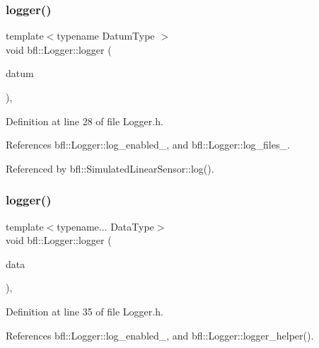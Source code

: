 \subsubsection{\texorpdfstring{logger()}{logger()}\hspace{0.1cm}{\footnotesize\ttfamily [1/4]}}
{\footnotesize\ttfamily template$<$typename Datum\+Type $>$ \\
void bfl\+::\+Logger\+::logger (\begin{DoxyParamCaption}\item[{Datum\+Type}]{datum }\end{DoxyParamCaption})\hspace{0.3cm}{\ttfamily [inline]}, {\ttfamily [inherited]}}



Definition at line 28 of file Logger.\+h.



References bfl\+::\+Logger\+::log\+\_\+enabled\+\_\+, and bfl\+::\+Logger\+::log\+\_\+files\+\_\+.



Referenced by bfl\+::\+Simulated\+Linear\+Sensor\+::log().

\mbox{\label{classbfl_1_1Logger_aca2086c9256e5c404872b91f7f25b97d}} 
\subsubsection{\texorpdfstring{logger()}{logger()}\hspace{0.1cm}{\footnotesize\ttfamily [2/4]}}
{\footnotesize\ttfamily template$<$typename... Data\+Type$>$ \\
void bfl\+::\+Logger\+::logger (\begin{DoxyParamCaption}\item[{Data\+Type...}]{data }\end{DoxyParamCaption})\hspace{0.3cm}{\ttfamily [inline]}, {\ttfamily [inherited]}}



Definition at line 35 of file Logger.\+h.



References bfl\+::\+Logger\+::log\+\_\+enabled\+\_\+, and bfl\+::\+Logger\+::logger\+\_\+helper().

